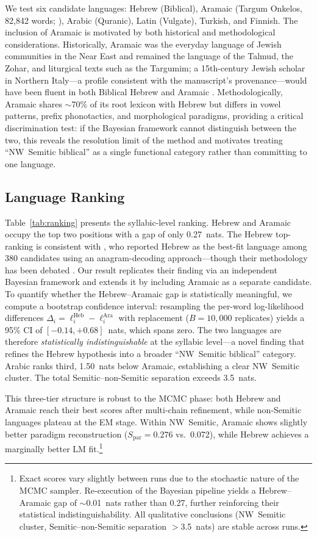 We test six candidate languages: Hebrew (Biblical), Aramaic (Targum Onkelos, 82,842 words; \citealt{sefaria2024}), Arabic (Quranic), Latin (Vulgate), Turkish, and Finnish.  The inclusion of Aramaic is motivated by both historical and methodological considerations.  Historically, Aramaic was the everyday language of Jewish communities in the Near East and remained the language of the Talmud, the Zohar, and liturgical texts such as the Targumim; a 15th-century Jewish scholar in Northern Italy---a profile consistent with the manuscript's provenance---would have been fluent in both Biblical Hebrew and Aramaic \citep{jastrow1903}.  Methodologically, Aramaic shares $\sim$70\% of its root lexicon with Hebrew but differs in vowel patterns, prefix phonotactics, and morphological paradigms, providing a critical discrimination test: if the Bayesian framework cannot distinguish between the two, this reveals the resolution limit of the method and motivates treating ``NW~Semitic biblical'' as a single functional category rather than committing to one language.

\subsection{Language Ranking}

Table~\ref{tab:ranking} presents the syllabic-level ranking.  Hebrew and Aramaic occupy the top two positions with a gap of only 0.27~nats.  The Hebrew top-ranking is consistent with \citet{hauer2016}, who reported Hebrew as the best-fit language among 380 candidates using an anagram-decoding approach---though their methodology has been debated \citep{bowern2021}.  Our result replicates their finding via an independent Bayesian framework and extends it by including Aramaic as a separate candidate.  To quantify whether the Hebrew--Aramaic gap is statistically meaningful, we compute a bootstrap confidence interval: resampling the per-word log-likelihood differences $\Delta_i = \ell_i^{\text{Heb}} - \ell_i^{\text{Ara}}$ with replacement ($B = 10{,}000$ replicates) yields a 95\% CI of $[-0.14, +0.68]$~nats, which spans zero.  The two languages are therefore \emph{statistically indistinguishable} at the syllabic level---a novel finding that refines the Hebrew hypothesis into a broader ``NW~Semitic biblical'' category.  Arabic ranks third, 1.50~nats below Aramaic, establishing a clear NW~Semitic cluster.  The total Semitic--non-Semitic separation exceeds 3.5~nats.

This three-tier structure is robust to the MCMC phase: both Hebrew and Aramaic reach their best scores after multi-chain refinement, while non-Semitic languages plateau at the EM stage.  Within NW~Semitic, Aramaic shows slightly better paradigm reconstruction ($S_{\text{par}} = 0.276$ vs.\ 0.072), while Hebrew achieves a marginally better LM fit.\footnote{Exact scores vary slightly between runs due to the stochastic nature of the MCMC sampler.  Re-execution of the Bayesian pipeline yields a Hebrew--Aramaic gap of $\sim$0.01~nats rather than 0.27, further reinforcing their statistical indistinguishability.  All qualitative conclusions (NW~Semitic cluster, Semitic--non-Semitic separation $>$3.5~nats) are stable across runs.}

